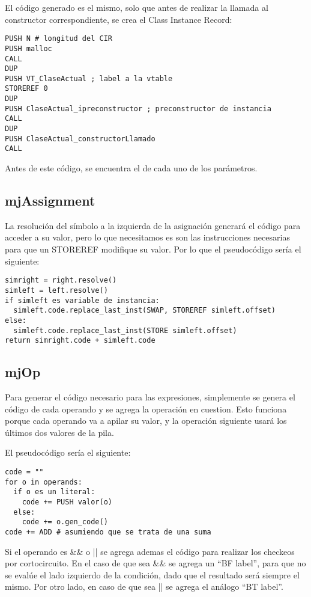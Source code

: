 \documentclass [a4paper,abstracton,titlepage]{scrartcl}
\begin{document}
El código generado es el mismo, solo que antes de realizar la llamada al
constructor correspondiente, se crea el Class Instance Record:

\begin{lstlisting}
PUSH N # longitud del CIR
PUSH malloc
CALL
DUP
PUSH VT_ClaseActual ; label a la vtable
STOREREF 0
DUP
PUSH ClaseActual_ipreconstructor ; preconstructor de instancia
CALL
DUP
PUSH ClaseActual_constructorLlamado
CALL
\end{lstlisting}

Antes de este código, se encuentra el de cada uno de los parámetros.

  \subsection{mjAssignment}

La resolución del símbolo a la izquierda de la asignación generará el código
para acceder a su valor, pero lo que necesitamos es son las instrucciones
necesarias para que un STOREREF modifique su valor. Por lo que el pseudocódigo
sería el siguiente:

\begin{lstlisting}
simright = right.resolve()
simleft = left.resolve()
if simleft es variable de instancia:
  simleft.code.replace_last_inst(SWAP, STOREREF simleft.offset)
else:
  simleft.code.replace_last_inst(STORE simleft.offset)
return simright.code + simleft.code
\end{lstlisting}

  \subsection{mjOp}

Para generar el código necesario para las expresiones, simplemente se genera el
código de cada operando y se agrega la operación en cuestion. Esto funciona
porque cada operando va a apilar su valor, y la operación siguiente usará los
últimos dos valores de la pila.

El pseudocódigo sería el siguiente:

\begin{lstlisting}
code = ""
for o in operands:
  if o es un literal:
    code += PUSH valor(o)
  else:
    code += o.gen_code()
code += ADD # asumiendo que se trata de una suma
\end{lstlisting}

Si el operando es \&\& o || se agrega ademas el código para realizar los checkeos por cortocircuito. En el caso de que sea \&\& se agrega un ``BF label'', para que no se evalúe el lado izquierdo de la condición, dado que el resultado será siempre el mismo. Por otro lado, en caso de que sea || se agrega el análogo ``BT label''.
\end{document}
